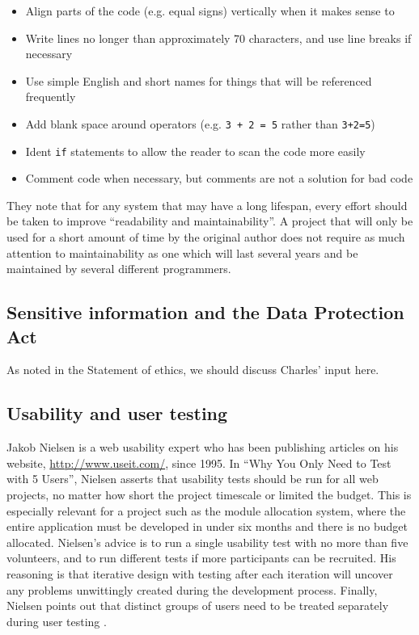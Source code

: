\documentclass[]{scrartcl}
\begin{document}
\begin{itemize}
  \item Align parts of the code (e.g. equal signs) vertically when it makes sense to
  \item Write lines no longer than approximately 70 characters, and use line breaks if necessary
  \item Use simple English and short names for things that will be referenced frequently
  \item Add blank space around operators (e.g. \texttt{3 + 2 = 5} rather than \texttt{3+2=5})
  \item Ident \texttt{if} statements to allow the reader to scan the code more easily
  \item Comment code when necessary, but comments are not a solution for bad code
\end{itemize}

They note that for any system that may have a long lifespan, every effort
should be taken to improve ``readability and maintainability''. A project that
will only be used for a short amount of time by the original author does not
require as much attention to maintainability as one which will last several
years and be maintained by several different programmers.

\subsection{Sensitive information and the Data Protection Act}
\label{sec:dataprotection}

As noted in the Statement of ethics, we should discuss Charles' input here.

\subsection{Usability and user testing}

Jakob Nielsen is a web usability expert who has been publishing articles on
his website, \url{http://www.useit.com/}, since 1995. In ``Why You Only Need to
Test with 5 Users'', Nielsen asserts that usability tests should be run for all
web projects, no matter how short the project timescale or limited the budget.
This is especially relevant for a project such as the module allocation
system, where the entire application must be developed in under six months and
there is no budget allocated. Nielsen's advice is to run a single usability
test with no more than five volunteers, and to run different tests if more
participants can be recruited. His reasoning is that iterative design with
testing after each iteration will uncover any problems unwittingly created
during the development process. Finally, Nielsen points out that distinct
groups of users need to be treated separately during user testing
\cite{nielsen2000fiveusers}.
\end{document}
